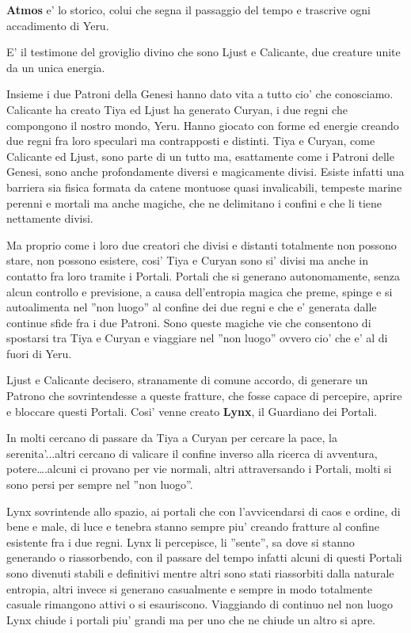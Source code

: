 \documentclass[a4paper,11pt,twoside,openany]{book}
\begin{document}
{		\textbf{Atmos} e' lo storico, colui che segna il passaggio del tempo e trascrive ogni accadimento di Yeru.
		
		E' il testimone del groviglio divino che sono Ljust e Calicante, due creature unite da un unica energia.
		
		Insieme i due Patroni della Genesi hanno dato vita a tutto cio' che conosciamo. Calicante ha creato Tiya ed Ljust ha generato Curyan, i due regni che compongono il nostro mondo, Yeru. Hanno giocato con forme ed energie creando due regni fra loro speculari ma contrapposti e distinti. Tiya e Curyan, come Calicante ed Ljust, sono parte di un tutto ma, esattamente come i Patroni delle Genesi, sono anche profondamente diversi e magicamente divisi. Esiste infatti una barriera sia fisica formata da catene montuose quasi invalicabili, tempeste marine perenni e mortali ma anche magiche, che ne delimitano i confini e che li tiene nettamente divisi.
		
		Ma proprio come i loro due creatori che divisi e distanti totalmente non possono stare, non possono esistere, cosi' Tiya e Curyan sono si' divisi ma anche in contatto fra loro tramite i Portali. Portali che si generano autonomamente, senza alcun controllo e previsione, a causa dell'entropia magica che preme, spinge e si autoalimenta nel ''non luogo'' al confine dei due regni e che e' generata dalle continue sfide fra i due Patroni. Sono queste magiche vie che consentono di spostarsi tra Tiya e Curyan e viaggiare nel ''non luogo'' ovvero cio' che e' al di fuori di Yeru.
		
		Ljust e Calicante decisero, stranamente di comune accordo, di generare un Patrono che sovrintendesse a queste fratture, che fosse capace di percepire, aprire e bloccare questi Portali. Cosi' venne creato \textbf{Lynx}, il Guardiano dei Portali.
		
		In molti cercano di passare da Tiya a Curyan per cercare la pace, la serenita'...altri cercano di valicare il confine inverso alla ricerca di avventura, potere\ldots .alcuni ci provano per vie normali, altri attraversando i Portali, molti si sono persi per sempre nel ''non luogo''.
		
		Lynx sovrintende allo spazio, ai portali che con l'avvicendarsi di caos e ordine, di bene e male, di luce e tenebra stanno sempre piu' creando fratture al confine esistente fra i due regni. Lynx li percepisce, li ''sente'', sa dove si stanno generando o riassorbendo, con il passare del tempo infatti alcuni di questi Portali sono divenuti stabili e definitivi mentre altri sono stati riassorbiti dalla naturale entropia, altri invece si generano casualmente e sempre in modo totalmente casuale rimangono attivi o si esauriscono. Viaggiando di continuo nel non luogo Lynx chiude i portali piu' grandi ma per uno che ne chiude un altro si apre.
		
}
\end{document}
